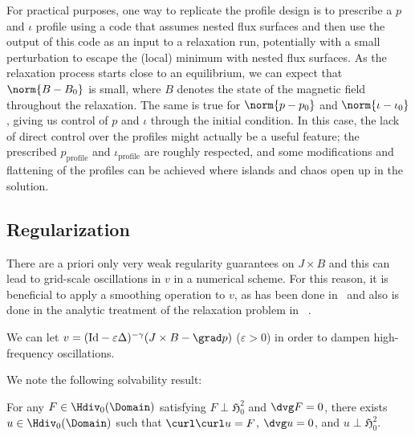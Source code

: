 \documentclass[%
 reprint,
 superscriptaddress,
 amsmath,amssymb,
 aps, nofootinbib, floatfix]{revtex4-2}
\begin{document}
For practical purposes, one way to replicate the profile design is to prescribe a $p$ and $\iota$ profile using a code that assumes nested flux surfaces and then use the output of this code as an input to a relaxation run, potentially with a small perturbation to escape the (local) minimum with nested flux surfaces.
%
As the relaxation process starts close to an equilibrium, we can expect that $\norm{B - B_0}$ is small, where $B$ denotes the state of the magnetic field throughout the relaxation. The same is true for $\norm{p - p_0}$ and  $\norm{\iota - \iota_0}$, giving us control of $p$ and $\iota$ through the initial condition. In this case, the lack of direct control over the profiles might actually be a useful feature; the prescribed $p_{\mathrm{profile}}$ and $\iota_{\mathrm{profile}}$ are roughly respected, and some modifications and flattening of the profiles can be achieved where islands and chaos open up in the solution.


\subsection{Regularization}
\label{sec:regularization}

There are a priori only very weak regularity guarantees on $J \times B$ and this can lead to grid-scale oscillations in $v$ in a numerical scheme. For this reason, it is beneficial to apply a smoothing operation to $v$, as has been done in~\cite{chodura_3d_1981} and also is done in the analytic treatment of the relaxation problem in ~\citep[Equation 2.1]{beekie_moffatts_2022}.

We can let $v = (\mathrm{Id} - \varepsilon \Delta)^{-\gamma} (J \times B - \grad p)$ ($\varepsilon > 0$) in order to dampen high-frequency oscillations.

We note the following solvability result:
\begin{lemma}
    \label{lem:curlcurl_solvability}
For any $F \in \Hdiv_0(\Domain)$ satisfying $F \perp {\mathfrak H}^2_0$ and $\dvg F = 0$, there exists $u \in \Hdiv_0(\Domain)$ such that $\curl \curl u = F$, $\dvg u = 0$, and $u \perp {\mathfrak H}_0^2$.
\end{lemma}
\end{document}
